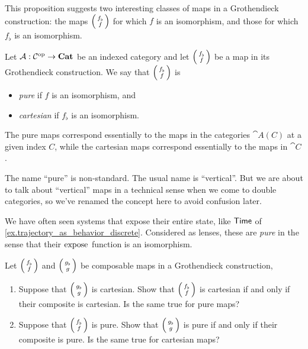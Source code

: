 \documentclass[DynamicalBook]{subfiles}
\begin{document}
This proposition suggests two interesting classes of maps in a Grothendieck
construction: the maps $\lens{f_{\flat}}{f}$ for which $f$ is an isomorphism, and
those for which $f_{\flat}$ is an isomorphism.
\begin{definition}\label{def.pure_and_cartesian}
Let $\mathcal{A} : \mathcal{C}^{\textnormal{op}} \to \textbf{Cat}$ be an indexed category and let
$\lens{f_{\flat}}{f}$ be a map in its Grothendieck construction. We say that
$\lens{f_{\flat}}{f}$ is
\begin{itemize}
\item \emph{pure} if $f$ is an isomorphism, and
\item \emph{cartesian} if $f_{\flat}$ is an isomorphism.
\end{itemize}
\end{definition}

The pure maps correspond essentially to the maps in the categories $\cat{A}(C)$
at a given index $C$, while the cartesian maps correspond essentially to the
maps in $\cat{C}$.

\begin{remark}
  The name ``pure'' is non-standard. The usual name is ``vertical''. But we are
  about to talk about ``vertical'' maps in a technical sense when we come to
  double categories, so we've renamed the concept here to avoid confusion later.
\end{remark}

\begin{example}
  We have often seen systems that expose their entire state, like $\mathsf{Time}$ 
  of \cref{ex.trajectory_as_behavior_discrete}. Considered as lenses, these are
  \emph{pure} in the sense that their $\mathrm{expose}_{\mathsf{}}$ function is an isomorphism.
\end{example}

\begin{exercise}\label{ex.2-of-3_for_pure_cartesian}
  Let $\lens{f_{\flat}}{f}$ and $\lens{g_{\flat}}{g}$ be composable maps in a Grothendieck construction,
  \begin{enumerate}
    \item Suppose that $\lens{g_{\flat}}{g}$ is cartesian.  Show that
      $\lens{f_{\flat}}{f}$ is cartesian if and only if their composite is
      cartesian. Is the same true for pure maps?
    \item Suppose that $\lens{f_{\flat}}{f}$ is pure. Show that
      $\lens{g_{\flat}}{g}$ is pure if and only if their composite is pure. Is
      the same true for cartesian maps?
  \end{enumerate}
\end{exercise}
\end{document}
